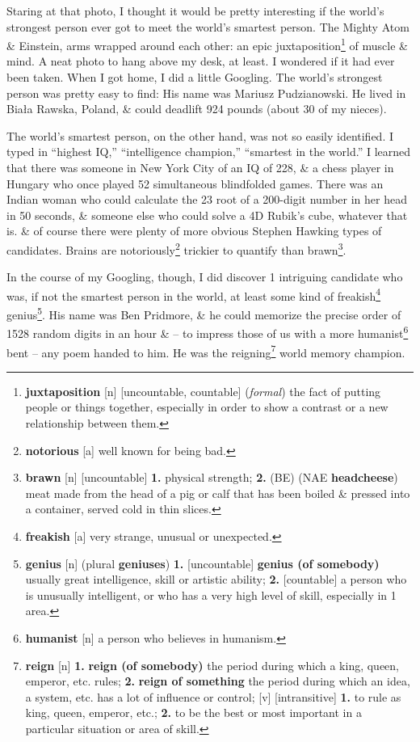 \documentclass[oneside]{book}
\numberwithin{equation}{section}
\begin{document}
Staring at that photo, I thought it would be pretty interesting if the world's strongest person ever got to meet the world's smartest person. The Mighty Atom \& Einstein, arms wrapped around each other: an epic juxtaposition\footnote{\textbf{juxtaposition} [n] [uncountable, countable] (\textit{formal}) the fact of putting people or things together, especially in order to show a contrast or a new relationship between them.} of muscle \& mind. A neat photo to hang above my desk, at least. I wondered if it had ever been taken. When I got home, I did a little Googling. The world's strongest person was pretty easy to find: His name was Mariusz Pudzianowski. He lived in Bia\l a Rawska, Poland, \& could deadlift 924 pounds (about 30 of my nieces).

The world's smartest person, on the other hand, was not so easily identified. I typed in ``highest IQ,'' ``intelligence champion,'' ``smartest in the world.'' I learned that there was someone in New York City of an IQ of 228, \& a chess player in Hungary who once played 52 simultaneous blindfolded games. There was an Indian woman who could calculate the 23 root of a 200-digit number in her head in 50 seconds, \& someone else who could solve a 4D Rubik's cube, whatever that is. \& of course there were plenty of more obvious Stephen Hawking types of candidates. Brains are notoriously\footnote{\textbf{notorious} [a] well known for being bad.} trickier to quantify than brawn\footnote{\textbf{brawn} [n] [uncountable] \textbf{1.} physical strength; \textbf{2.} (BE) (NAE \textbf{headcheese}) meat made from the head of a pig or calf that has been boiled \& pressed into a container, served cold in thin slices.}.

In the course of my Googling, though, I did discover 1 intriguing candidate who was, if not the smartest person in the world, at least some kind of freakish\footnote{\textbf{freakish} [a] very strange, unusual or unexpected.} genius\footnote{\textbf{genius} [n] (plural \textbf{geniuses}) \textbf{1.} [uncountable] \textbf{genius (of somebody)} usually great intelligence, skill or artistic ability; \textbf{2.} [countable] a person who is unusually intelligent, or who has a very high level of skill, especially in 1 area.}. His name was Ben Pridmore, \& he could memorize the precise order of 1528 random digits in an hour \& -- to impress those of us with a more humanist\footnote{\textbf{humanist} [n] a person who believes in humanism.} bent -- any poem handed to him. He was the reigning\footnote{\textbf{reign} [n] \textbf{1.} \textbf{reign (of somebody)} the period during which a king, queen, emperor, etc. rules; \textbf{2.} \textbf{reign of something} the period during which an idea, a system, etc. has a lot of influence or control; [v] [intransitive] \textbf{1.} to rule as king, queen, emperor, etc.; \textbf{2.} to be the best or most important in a particular situation or area of skill.} world memory champion.
\end{document}
